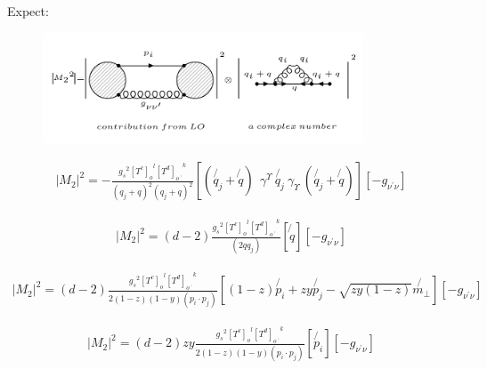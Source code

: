 Expect:
\begin{figure}[h!]
\centering
\includegraphics[width=0.85\textwidth]{images/expectationqg-g.png}
\end{figure}

\begin{equation}
\begin{split}
|M_2|^2=-\frac{{g_s}^2 {[T^c]_o}^l {[T^d]_{o\:^{\prime}}}^k}{(q_j + q)^2 (q_j + q)^2}
[(\not{q_j} + \not{q}) \:
 \:  \gamma^{\Upsilon} \: \not{q_j} \: 
{\gamma}_{\Upsilon} \: (\not{q_j} + \not{q})]
[-g_{{\nu}^{\prime}{\nu}}]
\end{split}
\end{equation}

\begin{equation}
\begin{split}
|M_2|^2=(d-2)\frac{{g_s}^2 {[T^c]_o}^l {[T^d]_{o\:^{\prime}}}^k}{(2qq_j)}
[\not{q}]
[-g_{{\nu}^{\prime}{\nu}}]
\end{split}
\end{equation}

\begin{equation}
\begin{split}
|M_2|^2=(d-2)\frac{{g_s}^2 {[T^c]_o}^l {[T^d]_{o\:^{\prime}}}^k}{2(1-z)(1-y)(p_i \cdot p_j)}
[(1-z) \not{p_i}+zy \not{p_j} - \sqrt{zy(1-z)} \not{{m}_{\bot}}]
[-g_{{\nu}^{\prime}{\nu}}]
\end{split}
\end{equation}

\begin{equation}
\begin{split}
|M_2|^2=(d-2)zy\frac{{g_s}^2 {[T^c]_o}^l {[T^d]_{o\:^{\prime}}}^k}{2(1-z)(1-y)(p_i \cdot p_j)}
[\not{p_i}]
[-g_{{\nu}^{\prime}{\nu}}]
\end{split}
\end{equation}







